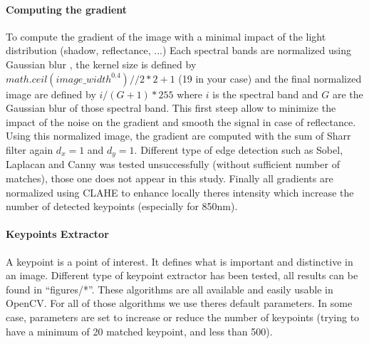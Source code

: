 \documentclass[]{elsarticle}
\begin{document}
			\paragraph{Computing the gradient} To compute the gradient of the image with a minimal impact of the light distribution (shadow, reflectance, ...)
			Each spectral bands are normalized using Gaussian blur \cite{sage0303}, the kernel size is defined by $math.ceil(image\_width^{0.4}) // 2 * 2 +1$ (19 in your case)
			and the final normalized image are defined by $i/(G+1)*255$ where $i$ is the spectral band and $G$ are the Gaussian blur of those spectral band.
			This first steep allow to minimize the impact of the noise on the gradient and smooth the signal in case of reflectance.
			Using this normalized image, the gradient are computed with the sum of Sharr filter \cite{Seitz} again $d_x=1$ and $d_y=1$.
			Different type of edge detection such as Sobel, Laplacan and Canny was tested unsuccessfully (without sufficient number of matches), those one does not appear in this study.
			Finally all gradients are normalized using CLAHE \cite{zuiderveld1994contrast} to enhance locally theres intensity which increase the number of detected keypoints (especially for 850nm).
			
			\paragraph{Keypoints Extractor}
			A keypoint is a point of interest. It defines what is important and distinctive in an image.
			Different type of keypoint extractor has been tested, all results can be found in ``figures/*''.
			These algorithms are all available and easily usable in OpenCV.
			For all of those algorithms we use theres default parameters.
			In some case, parameters are set to increase or reduce the number of keypoints (trying to have a minimum of 20 matched keypoint, and less than 500).
			
\end{document}
